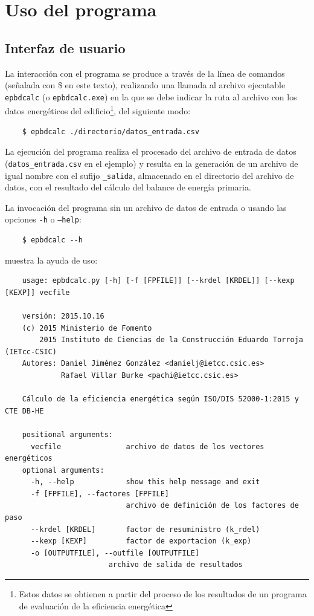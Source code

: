 \documentclass[10pt,notitlepage,oneside,a4paper]{article}
\begin{document}
\section{Uso del programa}
\label{sec:usoprograma}

\subsection{Interfaz de usuario}

La interacción con el programa se produce a través de la línea de comandos (señalada con \$ en este texto), realizando una llamada al archivo ejecutable \texttt{epbdcalc} (o \texttt{epbdcalc.exe}) en la que se debe indicar la ruta al archivo con los datos energéticos del edificio\footnote{Estos datos se obtienen a partir del proceso de los resultados de un programa de evaluación de la eficiencia energética}, del siguiente modo:

\begin{Verbatim}
	$ epbdcalc ./directorio/datos_entrada.csv
\end{Verbatim}

La ejecución del programa realiza el procesado del archivo de entrada de datos (\texttt{datos\_entrada.csv} en el ejemplo) y resulta en la generación de un archivo de igual nombre con el sufijo \texttt{\_salida}, almacenado en el directorio del archivo de datos, con el resultado del cálculo del balance de energía primaria.

La invocación del programa sin un archivo de datos de entrada o usando las opciones \texttt{-h} o \texttt{--help}:

\begin{Verbatim}
	$ epbdcalc --h
\end{Verbatim}

 muestra la ayuda de uso:

\begin{Verbatim}
    usage: epbdcalc.py [-h] [-f [FPFILE]] [--krdel [KRDEL]] [--kexp [KEXP]] vecfile

	versión: 2015.10.16
	(c) 2015 Ministerio de Fomento
	    2015 Instituto de Ciencias de la Construcción Eduardo Torroja (IETcc-CSIC)
	Autores: Daniel Jiménez González <danielj@ietcc.csic.es>
	         Rafael Villar Burke <pachi@ietcc.csic.es>

    Cálculo de la eficiencia energética según ISO/DIS 52000-1:2015 y CTE DB-HE

    positional arguments:
      vecfile               archivo de datos de los vectores energéticos
    optional arguments:
      -h, --help            show this help message and exit
      -f [FPFILE], --factores [FPFILE]
                            archivo de definición de los factores de paso
      --krdel [KRDEL]       factor de resuministro (k_rdel)
      --kexp [KEXP]         factor de exportacion (k_exp)
      -o [OUTPUTFILE], --outfile [OUTPUTFILE]
                        archivo de salida de resultados
\end{Verbatim}
\end{document}
